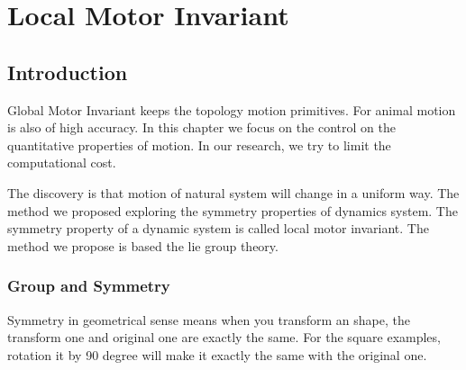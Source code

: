\chapter{Local Motor Invariant}

\ifpdf
    \graphicspath{{LocalInvariant/LocalInvariantFigs/PNG/}{LocalInvariant/LocalInvariantFigs/PDF/}{LocalInvariant/LocalInvariantFigs/}}
\else
    \graphicspath{{LocalInvariant/LocalInvariantFigs/EPS/}{LocalInvariant/LocalInvariantFigs/}}
\fi

\section{Introduction}
Global Motor Invariant keeps the topology motion primitives.
For animal motion is also of high accuracy.
In this chapter we focus on the control on the quantitative properties of motion.
In our research, we try to limit the computational cost.


The discovery is that motion of natural system will change in a uniform way.
The method we proposed exploring the symmetry properties of dynamics system.
The symmetry property of a dynamic system is called local motor invariant.
The method we propose is based the lie group theory.

\subsection{Group and Symmetry}
Symmetry in geometrical sense means when you transform an shape, the transform one and original one are exactly the same.
For the square examples, rotation it by 90 degree will make it exactly the same with the original one.



